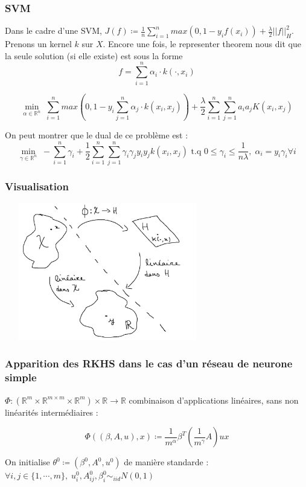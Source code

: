 \documentclass[aspectratio=169]{beamer}
\begin{document}
\begin{frame}
	\frametitle{SVM}
	Dans le cadre d'une SVM, $J(f) \coloneqq \frac{1}{n} \sum_{i=1}^{n} max(0, 1 - y_i f(x_i)) + \frac{\lambda}{2} ||f||_H^2$. Prenons un kernel $k$ sur $X$. Encore une fois, le representer theorem nous dit que la seule solution (si elle existe) est sous la forme
	\[f = \sum_{i=1}^{n} \alpha_i \cdot k(\cdot, x_i)\]
	
	\pause
	
	\[\min_{\alpha \in \mathbb{R}^n} \; \sum_{i=1}^{n} max(0, 1 - y_i \sum_{j=1}^{n} \alpha_j \cdot k(x_i, x_j))  + \frac{\lambda}{2} \sum_{i=1}^{n} \sum_{j=1}^{n} a_i a_j K(x_i, x_j) \]
	
	\pause
	
	On peut montrer que le dual de ce problème est :
	\[\min_{\gamma \in \mathbb{R}^n} \; -\sum_{i=1}^{n} \gamma_i + \frac{1}{2} \sum_{i=1}^{n} \sum_{j=1}^{n} \gamma_i \gamma_j y_i y_j k(x_i, x_j) \text{ t.q } 0 \leq \gamma_i \leq \frac{1}{n \lambda}, \; \alpha_i = y_i \gamma_i \forall i \]
\end{frame}

\begin{frame}
	\frametitle{Visualisation}
	\begin{center}
		\includegraphics[width=9cm, height=6cm]{RKHS_schema.jpg} 
	\end{center}
\end{frame}

\begin{frame}
	\frametitle{Apparition des RKHS dans le cas d'un réseau de neurone simple}
	$\Phi : (\mathbb{R}^m \times \mathbb{R}^{m \times m} \times \mathbb{R}^m) \times \mathbb{R} \to \mathbb{R}$ combinaison d'applications linéaires, sans non linéarités  intermédiaires  :
	
	\[ \Phi ((\beta, A, u), x) \coloneqq \frac{1}{m^{\alpha}} \beta^T
	\left( \frac{1}{m^{\gamma}} A \right) u x \]
	
	\pause
	
	On initialise $\theta^0 \coloneqq (\beta^0, A^0, u^0)$ de manière standarde : 
	$ \forall i,j \in \{1, \cdots, m\} , \; u_i^0, A_{ij}^0, \beta_i^0 \sim_{iid} N(0, 1)$
\end{frame}
\end{document}

